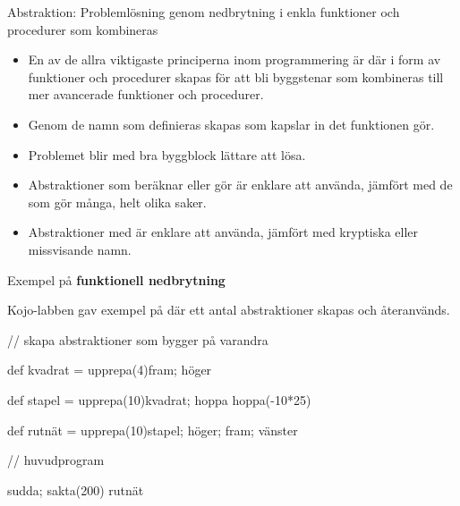 \begin{Slide}{Abstraktion: Problemlösning genom nedbrytning i enkla funktioner och procedurer som kombineras}\SlideFontSmall
\begin{itemize}
\item En av de allra viktigaste principerna inom programmering är  där   i form av funktioner och procedurer skapas för att bli byggstenar som kombineras till mer avancerade funktioner och procedurer.

\item Genom de namn som definieras skapas  som kapslar in det funktionen gör.

\item Problemet blir med bra byggblock lättare att lösa.

\item Abstraktioner som beräknar eller gör  är enklare att använda, jämfört med de som gör många, helt olika saker.

\item Abstraktioner med  är enklare att använda, jämfört med kryptiska eller missvisande namn.
\end{itemize}

\end{Slide}



\begin{Slide}{Exempel på \textbf{funktionell nedbrytning}}

Kojo-labben gav exempel på  där ett antal abstraktioner skapas och återanvänds.

\begin{Code}
// skapa abstraktioner som bygger på varandra

def kvadrat = upprepa(4){fram; höger}

def stapel = {
  upprepa(10){kvadrat; hoppa}
  hoppa(-10*25)
}

def rutnät = upprepa(10){stapel; höger; fram; vänster}

// huvudprogram

sudda; sakta(200)
rutnät
\end{Code}
\end{Slide}


